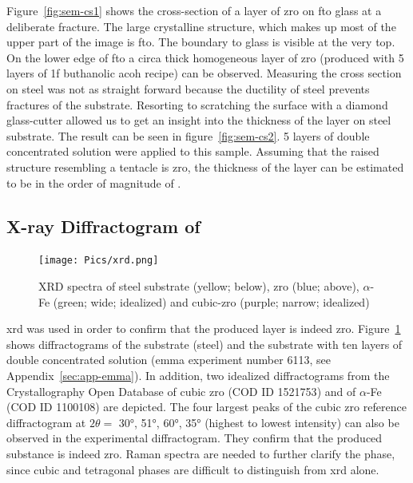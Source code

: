 Figure~\ref{fig:sem-cs1} shows the cross-section of a layer of \gls{zro} on \gls{fto} glass at a deliberate fracture.
The large crystalline structure, which makes up most of the upper part of the image is \gls{fto}. 
The boundary to glass is visible at the very top. 
On the lower edge of \gls{fto} a circa  thick homogeneous layer of \gls{zro} (produced with 5 layers of \gls{1f} buthanolic \gls{acoh} recipe)  can be observed.
Measuring the cross section on steel was not as straight forward because the ductility of steel prevents fractures of the substrate. 
Resorting to scratching the surface with a diamond glass-cutter allowed us to get an insight into the thickness of the layer on steel substrate.
%
The result can be seen in figure~\ref{fig:sem-cs2}. 
5 layers of double concentrated solution were applied to this sample. 
Assuming that the raised structure resembling a tentacle is \gls{zro}, 
the thickness of the layer can be estimated to be in the order of magnitude of .

\subsection{X-ray Diffractogram of }
\begin{figure}
	\centering
	\texttt{[image: Pics/xrd.png]}
	\caption{XRD spectra of steel substrate (yellow; below), \gls{zro} (blue; above), $\alpha$-Fe (green; wide; idealized) and cubic-\gls{zro} (purple; narrow; idealized)\cite{gkatz1971xray} }%
	\label{fig:xrd}
\end{figure}

\Gls{xrd} was used in order to confirm that the produced layer is indeed \gls{zro}. 
Figure~\ref{fig:xrd} shows diffractograms of the substrate (steel) and 
the substrate with ten layers of double concentrated solution (\gls{emma} experiment number 6113, see Appendix~\ref{sec:app-emma}).
In addition, two idealized diffractograms from the Crystallography Open Database of cubic \gls{zro} (COD ID 1521753\cite{gkatz1971xray}) and of $\alpha$-Fe (COD ID 1100108) are depicted.
%
The four largest peaks of the cubic \gls{zro} reference diffractogram at $2\theta=$ \ang{30}, \ang{51}, \ang{60}, \ang{35} (highest to lowest intensity) can also be observed in the experimental diffractogram. %
They confirm that the produced substance is indeed \gls{zro}.
Raman spectra are needed to further clarify the phase, 
since cubic and tetragonal phases are difficult to distinguish from \gls{xrd} alone\cite{Purohit2006Combustion}.


